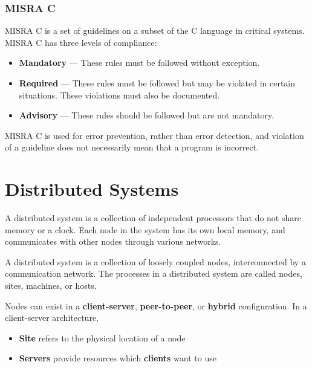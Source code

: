 \documentclass{article}
\begin{document}
\subsubsection{MISRA C}
MISRA C is a set of guidelines on a subset of the C language in
critical systems. MISRA C has three levels of compliance:
\begin{itemize}
    \item \textbf{Mandatory} --- These rules must be followed without
          exception.
    \item \textbf{Required} --- These rules must be followed but may
          be violated in certain situations. These violations must also
          be documented.
    \item \textbf{Advisory} --- These rules should be followed but are
          not mandatory.
\end{itemize}
MISRA C is used for error prevention, rather than error detection,
and violation of a guideline does not necessarily mean that a program
is incorrect.
\section{Distributed Systems}
A distributed system is a collection of independent processors that do
not share memory or a clock. Each node in the system has its own local
memory, and communicates with other nodes through various networks.

A distributed system is a collection of loosely coupled nodes,
interconnected by a communication network. The processes in a
distributed system are called nodes, sites, machines, or hosts.

Nodes can exist in a \textbf{client-server}, \textbf{peer-to-peer}, or
\textbf{hybrid} configuration. In a client-server architecture,
\begin{itemize}
    \item \textbf{Site} refers to the physical location of a node
    \item \textbf{Servers} provide resources which \textbf{clients}
          want to use
\end{itemize}
\end{document}
